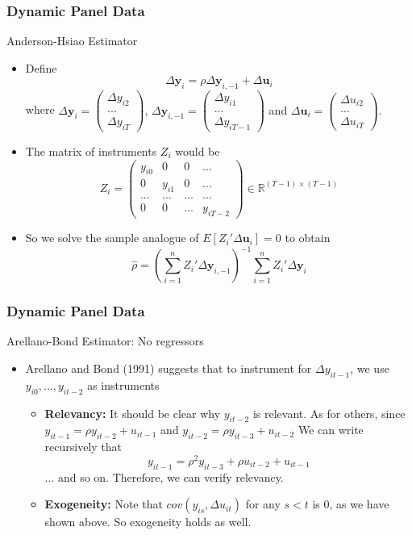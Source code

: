 \documentclass{beamer}
\begin{document}
\begin{frame}
\frametitle{Dynamic Panel Data}
Anderson-Hsiao Estimator
\begin{itemize}
\item Define
\[
\Delta \mathbf{y}_i = \rho\Delta\mathbf{y}_{i,-1}+\Delta \mathbf{u}_i
\]
where \small{$\Delta \mathbf{y}_i=\begin{pmatrix} \Delta y_{i2}\\ ...\\ \Delta y_{iT} \end{pmatrix}$, $\Delta \mathbf{y}_{i,-1}=\begin{pmatrix} \Delta y_{i1}\\ ...\\ \Delta y_{iT-1} \end{pmatrix}$ and $\Delta \mathbf{u}_i=\begin{pmatrix} \Delta u_{i2}\\ ...\\ \Delta u_{iT} \end{pmatrix}$.}\normalsize 
\item The matrix of instruments $Z_i$ would be
\small{\[
Z_i = \begin{pmatrix}y_{i0}& 0 & 0 & ... \\ 0 & y_{i1}& 0 & ... \\ ... & ... &...&...\\ 0 & 0 & ... & y_{iT-2} \end{pmatrix}\in\mathbb{R}^{(T-1)\times (T-1)}
\]}\normalsize
\item So we solve the sample analogue of $E[Z_i'\Delta \mathbf{u}_i]=0$ to obtain
\[
\hat{\rho}=\left(\sum_{i=1}^n  Z_i'\Delta \mathbf{y}_{i,-1}\right)^{-1}\sum_{i=1}^n  Z_i'\Delta \mathbf{y}_{i}
\]
\end{itemize}
\end{frame}

\begin{frame}
\frametitle{Dynamic Panel Data}
Arellano-Bond Estimator: No regressors
\begin{itemize}
\item Arellano and Bond (1991) suggests that to instrument for $\Delta y_{it-1}$, we use $y_{i0},...,y_{it-2}$ as instruments
\begin{itemize}
\item \textbf{Relevancy:} It should be clear why $y_{it-2}$ is relevant. As for others, since $y_{it-1}=\rho y_{it-2}+u_{it-1}$ and $y_{it-2}=\rho y_{it-3}+u_{it-2}$ We can write recursively that
\[
y_{it-1} = \rho^2 y_{it-3}+\rho u_{it-2} + u_{it-1}
\]
... and so on. Therefore, we can verify relevancy.
\item \textbf{Exogeneity:} Note that $cov(y_{is},\Delta u_{it})$ for any $s<t$ is 0, as we have shown above. So exogeneity holds as well. 
\end{itemize}
\end{itemize}
\end{frame}
\end{document}
